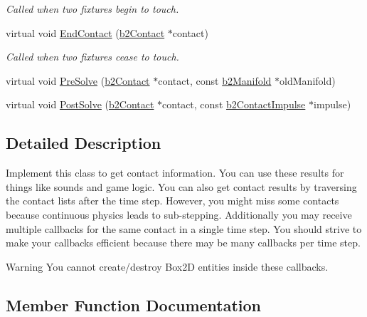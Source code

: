 \begin{DoxyCompactItemize}
\begin{DoxyCompactList}\small\item\em Called when two fixtures begin to touch. \end{DoxyCompactList}\item 
\mbox{\label{classb2ContactListener_afb3059058e5c47903a3947c2eef5826b}} 
virtual void \hyperlink{classb2ContactListener_afb3059058e5c47903a3947c2eef5826b}{End\+Contact} (\hyperlink{classb2Contact}{b2\+Contact} $\ast$contact)
\begin{DoxyCompactList}\small\item\em Called when two fixtures cease to touch. \end{DoxyCompactList}\item 
virtual void \hyperlink{classb2ContactListener_a416f85eb45a1099053402b15a19a7de0}{Pre\+Solve} (\hyperlink{classb2Contact}{b2\+Contact} $\ast$contact, const \hyperlink{structb2Manifold}{b2\+Manifold} $\ast$old\+Manifold)
\item 
virtual void \hyperlink{classb2ContactListener_acd58ec96f7569b95eec65b8ca3f8013d}{Post\+Solve} (\hyperlink{classb2Contact}{b2\+Contact} $\ast$contact, const \hyperlink{structb2ContactImpulse}{b2\+Contact\+Impulse} $\ast$impulse)
\end{DoxyCompactItemize}


\subsection{Detailed Description}
Implement this class to get contact information. You can use these results for things like sounds and game logic. You can also get contact results by traversing the contact lists after the time step. However, you might miss some contacts because continuous physics leads to sub-\/stepping. Additionally you may receive multiple callbacks for the same contact in a single time step. You should strive to make your callbacks efficient because there may be many callbacks per time step. \begin{DoxyWarning}{Warning}
You cannot create/destroy Box2D entities inside these callbacks. 
\end{DoxyWarning}


\subsection{Member Function Documentation}
\mbox{\label{classb2ContactListener_acd58ec96f7569b95eec65b8ca3f8013d}} 
